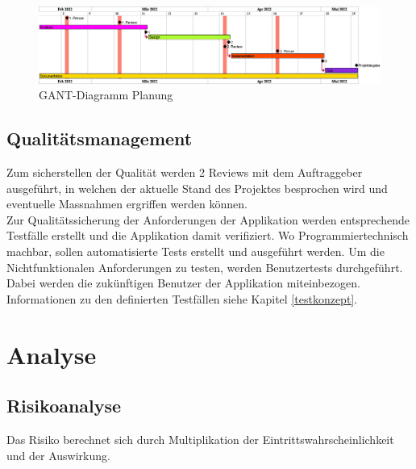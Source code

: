 \vspace*{3mm}

\begin{figure}[H]
    \begin{center}
        \includegraphics[width=0.95\linewidth]{content/diagrams/out/planning/planning.png}
        \caption{GANT-Diagramm Planung}
      \end{center}
\end{figure}
\newpage

\subsection{Qualitätsmanagement}
Zum sicherstellen der Qualität werden 2 Reviews mit dem Auftraggeber ausgeführt, in welchen der aktuelle Stand des Projektes besprochen wird und eventuelle Massnahmen ergriffen werden können. \\
Zur Qualitätssicherung der Anforderungen der Applikation werden entsprechende Testfälle erstellt und die Applikation damit verifiziert. Wo Programmiertechnisch machbar, sollen automatisierte Tests erstellt und ausgeführt werden. Um die Nichtfunktionalen Anforderungen zu testen, werden Benutzertests durchgeführt. Dabei werden die zukünftigen Benutzer der Applikation miteinbezogen. Informationen zu den definierten Testfällen siehe Kapitel \ref{testkonzept}.

\newpage
\section{Analyse}
\subsection{Risikoanalyse}
Das Risiko berechnet sich durch Multiplikation der Eintrittswahrscheinlichkeit und der Auswirkung. \\

